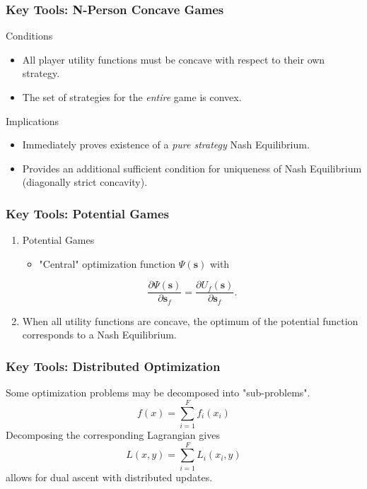 \documentclass[10pt,tgadventor, onlymath]{beamer}
\begin{document}
\begin{frame}
\frametitle{Key Tools: N-Person Concave Games}
Conditions
\begin{itemize}
\item All player utility functions must be concave with respect to their own strategy.
\item The set of strategies for the \emph{entire} game is convex. 
\end{itemize}
\bigskip
Implications
\begin{itemize}
\item Immediately proves existence of a \emph{pure strategy} Nash Equilibrium.
\item Provides an additional sufficient condition for uniqueness of Nash Equilibrium (diagonally strict concavity).
\end{itemize}
\end{frame}


\begin{frame}
\frametitle{Key Tools: Potential Games}
\begin{enumerate}
\item 
Potential Games
\begin{itemize}
\item "Central" optimization function $\Psi(\mathbf{s})$ with
\end{itemize}
\begin{equation}\label{potential_game_condition}
\frac{\partial \Psi(\mathbf{s})}{\partial \mathbf{s}_{f}}
 =
 \frac{\partial U_f(\mathbf{s})}{\partial \mathbf{s}_{f}}.
\end{equation} 
\item 
When all utility functions are concave, the optimum of the potential function corresponds to a Nash Equilibrium.
\end{enumerate}
\end{frame}

\begin{frame}
\frametitle{Key Tools: Distributed Optimization}
Some optimization problems may be decomposed into "sub-problems".
\begin{equation}
f(x) = \sum_{i = 1}^{F} f_{i}(x_{i})
\end{equation}
Decomposing the corresponding Lagrangian gives
\begin{equation}
L(x,y) = \sum_{i = 1}^{F} L_i(x_i,y)
\end{equation}
allows for dual ascent with distributed updates.
\end{frame}
%
\end{document}
